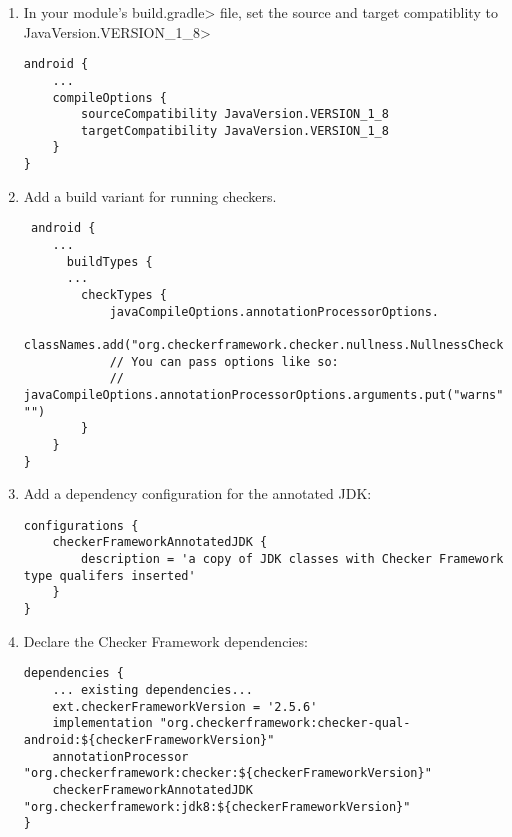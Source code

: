 \begin{enumerate}

\item In your module's \<build.gradle> file, set the source and target
  compatiblity to \<JavaVersion.VERSION\_1\_8>

\begin{Verbatim}
android {
    ...
    compileOptions {
        sourceCompatibility JavaVersion.VERSION_1_8
        targetCompatibility JavaVersion.VERSION_1_8
    }
}
\end{Verbatim}

\item Add a build variant for running checkers.

 \begin{Verbatim}
 android {
    ...
      buildTypes {
      ...
        checkTypes {
            javaCompileOptions.annotationProcessorOptions.
                    classNames.add("org.checkerframework.checker.nullness.NullnessChecker")
            // You can pass options like so:
            // javaCompileOptions.annotationProcessorOptions.arguments.put("warns", "")
        }
    }
}
\end{Verbatim}

\item Add a dependency configuration for the annotated JDK:

\begin{mysmall}
\begin{Verbatim}
configurations {
    checkerFrameworkAnnotatedJDK {
        description = 'a copy of JDK classes with Checker Framework type qualifers inserted'
    }
}

\end{Verbatim}
\end{mysmall}

\item Declare the Checker Framework dependencies:

\begin{mysmall}
\begin{Verbatim}
dependencies {
    ... existing dependencies...
    ext.checkerFrameworkVersion = '2.5.6'
    implementation "org.checkerframework:checker-qual-android:${checkerFrameworkVersion}"
    annotationProcessor "org.checkerframework:checker:${checkerFrameworkVersion}"
    checkerFrameworkAnnotatedJDK "org.checkerframework:jdk8:${checkerFrameworkVersion}"
}
\end{Verbatim}
\end{mysmall}


\end{enumerate}
